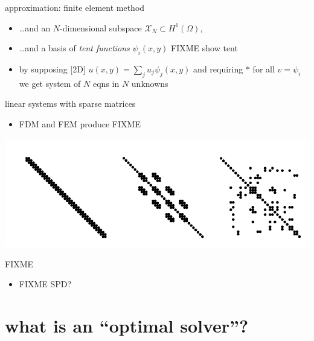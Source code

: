 \documentclass[hide notes,intlimits,usenames,dvipsnames]{beamer}
\begin{document}
\begin{frame}{approximation: finite element method}
\begin{itemize}
\item \dots and an $N$-dimensional subspace $\mathcal{X}_N \subset H^1(\Omega)$,
\item \dots and a basis of \emph{tent functions} $\psi_i(x,y)$ FIXME show tent
\item by supposing [2D] $u(x,y) = \sum_j u_{j} \psi_{j}(x,y)$ and requiring $\ast$ for all $v=\psi_i$ we get system of $N$ eqns in $N$ unknowns
\end{itemize}
\end{frame}


\begin{frame}{linear systems with sparse matrices}
\begin{itemize}
\item FDM and FEM produce FIXME
\end{itemize}

\includegraphics[width=\textwidth]{figs/spythree}
\end{frame}


\begin{frame}{FIXME}
\begin{itemize}
\item FIXME  SPD?
\end{itemize}
\end{frame}


\section{what is an ``optimal solver''?}
\end{document}
